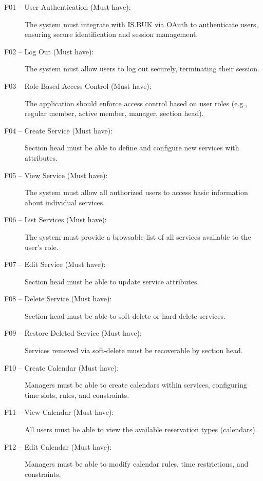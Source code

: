 \begin{description}
  \item [F01 -- User Authentication (Must have):] The system must integrate with IS.BUK via OAuth to authenticate users, ensuring secure identification and session management.
  
  \item [F02 -- Log Out (Must have):] The system must allow users to log out securely, terminating their session.

  \item [F03 -- Role-Based Access Control (Must have):] The application should enforce access control based on user roles (e.g., regular member, active member, manager, section head).

  \item [F04 -- Create Service (Must have):] Section head must be able to define and configure new services with attributes.

  \item [F05 -- View Service (Must have):] The system must allow all authorized users to access basic information about individual services.

  \item [F06 -- List Services (Must have):] The system must provide a browsable list of all services available to the user’s role.

  \item [F07 -- Edit Service (Must have):] Section head must be able to update service attributes.

  \item [F08 -- Delete Service (Must have):] Section head must be able to soft-delete or hard-delete services.

  \item [F09 -- Restore Deleted Service (Must have):] Services removed via soft-delete must be recoverable by section head.

  \item [F10 -- Create Calendar (Must have):] Managers must be able to create calendars within services, configuring time slots, rules, and constraints.

  \item [F11 -- View Calendar (Must have):] All users must be able to view the available reservation types (calendars).

  \item [F12 -- Edit Calendar (Must have):] Managers must be able to modify calendar rules, time restrictions, and constraints.


\end{description}
